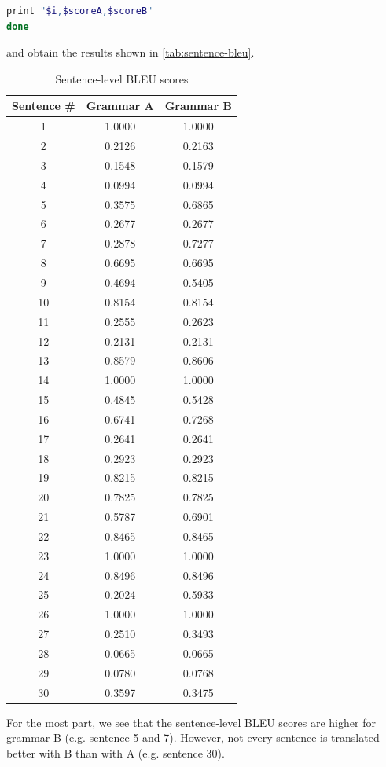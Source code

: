 \documentclass[a4paper,oneside,reqno]{amsart}
\begin{document}
\begin{enumerate}[label=\arabic*.]
\begin{lstlisting}[language=bash]
  print "$i,$scoreA,$scoreB"
done
    \end{lstlisting}
    and obtain the results shown in \autoref{tab:sentence-bleu}.
    \begin{table}[H]
      \begin{tabular}{ccc}
        \toprule
        Sentence \# & Grammar A & Grammar B \\
        \midrule
        1 & 1.0000 & 1.0000 \\
        2 & 0.2126 & 0.2163 \\
        3 & 0.1548 & 0.1579 \\
        4 & 0.0994 & 0.0994 \\
        5 & 0.3575 & 0.6865 \\
        6 & 0.2677 & 0.2677 \\
        7 & 0.2878 & 0.7277 \\
        8 & 0.6695 & 0.6695 \\
        9 & 0.4694 & 0.5405 \\
        10 & 0.8154 & 0.8154 \\
        11 & 0.2555 & 0.2623 \\
        12 & 0.2131 & 0.2131 \\
        13 & 0.8579 & 0.8606 \\
        14 & 1.0000 & 1.0000 \\
        15 & 0.4845 & 0.5428 \\
        16 & 0.6741 & 0.7268 \\
        17 & 0.2641 & 0.2641 \\
        18 & 0.2923 & 0.2923 \\
        19 & 0.8215 & 0.8215 \\
        20 & 0.7825 & 0.7825 \\
        21 & 0.5787 & 0.6901 \\
        22 & 0.8465 & 0.8465 \\
        23 & 1.0000 & 1.0000 \\
        24 & 0.8496 & 0.8496 \\
        25 & 0.2024 & 0.5933 \\
        26 & 1.0000 & 1.0000 \\
        27 & 0.2510 & 0.3493 \\
        28 & 0.0665 & 0.0665 \\
        29 & 0.0780 & 0.0768 \\
        30 & 0.3597 & 0.3475 \\
        \bottomrule
      \end{tabular}
      \caption{Sentence-level BLEU scores}
      \label{tab:sentence-bleu}
    \end{table}
    For the most part, we see that the sentence-level BLEU scores are higher
    for grammar B (e.g. sentence 5 and 7). However, not every sentence is
    translated better with B than with A (e.g. sentence 30).


\end{enumerate}
\end{document}
